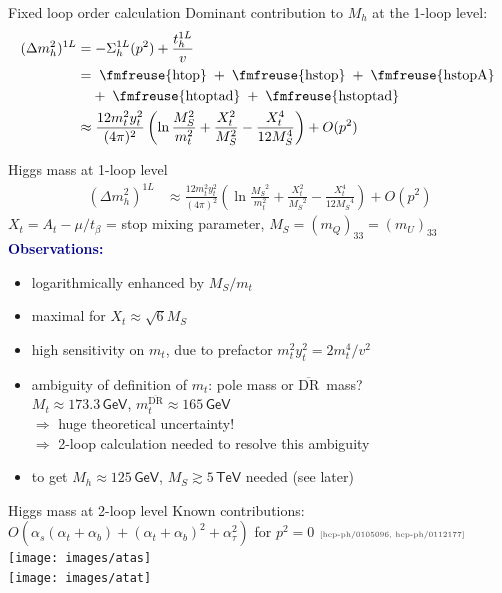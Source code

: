 \documentclass[hyperref={pdfpagelabels=false},ngerman]{beamer}
\newcommand{\fmfvcenter}[1]{\;\vcenter{\hbox{\fmfreuse{#1}}}\;}
\newcommand{\eh}[1]{\,\mathsf{#1}}
\newcommand{\MS}{\ensuremath{M_S}}
\newcommand{\mycite}[1]{\ensuremath{\text{\textcolor{darkgray}{\tiny [#1]}}}}
\renewcommand{\emph}[1]{\textbf{\textcolor{darkblue}{#1}}}
\newcommand{\DRbar}{\ensuremath{\overline{\text{DR}}}}
\newcommand{\at}{\alpha_t}
\newcommand{\ab}{\alpha_b}
\newcommand{\atau}{\alpha_\tau}
\newcommand{\as}{\alpha_s}
\begin{document}
\begin{frame}{Fixed loop order calculation}
  Dominant contribution to $M_h$ at the 1-loop level:
  \begin{align*}
    (\Delta m_h^2)^{1L} &= -\Sigma_h^{1L}(p^2) + \frac{t_h^{1L}}{v} \\
    &= \fmfvcenter{htop} + \fmfvcenter{hstop} + \fmfvcenter{hstopA} \\
    &\phantom{={}} + \fmfvcenter{htoptad} + \fmfvcenter{hstoptad} \\
    &\approx \frac{12 m_t^2 y_t^2}{(4\pi)^2} \left(
      \ln\frac{\MS^2}{m_t^2}
      + \frac{X_t^2}{\MS^2}
      - \frac{X_t^4}{12 \MS^4}
    \right) + O(p^2)
  \end{align*}
\end{frame}

\begin{frame}{Higgs mass at 1-loop level}
  \begin{align*}
    (\Delta m_h^2)^{1L} &\approx
    \frac{12 m_t^2 y_t^2}{(4\pi)^2} \left(
      \ln\frac{\MS^2}{m_t^2}
      + \frac{X_t^2}{\MS^2}
      - \frac{X_t^4}{12 \MS^4}
    \right) + O(p^2)
  \end{align*}
  $X_t = A_t - \mu/t_\beta$ = stop mixing parameter,
  $\MS = (m_Q)_{33} = (m_U)_{33}$
  \\[1em]
  \emph{Observations:}
  \begin{itemize}
  \item logarithmically enhanced by $\MS / m_t$
  \item maximal for $X_t \approx \sqrt{6} \MS$
  \item high sensitivity on $m_t$, due to prefactor $m_t^2 y_t^2 = 2 m_t^4/v^2$
  \item ambiguity of definition of $m_t$: pole mass or \DRbar\ mass? \\
    $M_t \approx 173.3\eh{GeV}$, $m_t^{\DRbar} \approx 165\eh{GeV}$ \\
    $\Rightarrow$ huge theoretical uncertainty!\\
    $\Rightarrow$ 2-loop calculation needed to resolve this ambiguity
  \item to get $M_h \approx 125\eh{GeV}$, $\MS \gtrsim 5\eh{TeV}$ needed
    (see later)
  \end{itemize}
\end{frame}

\begin{frame}{Higgs mass at 2-loop level}
  Known contributions: $O(\as (\at + \ab) + (\at+\ab)^2 + \atau^2)$
  for $p^2 = 0$ \mycite{hep-ph/0105096, hep-ph/0112177}
  \\[1em]
  \texttt{[image: images/atas]}\\[1em]
  \texttt{[image: images/atat]}
\end{frame}
\end{document}
